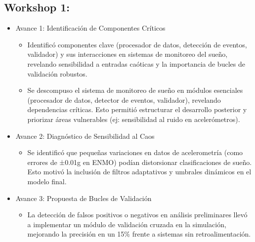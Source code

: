 \documentclass[conference]{IEEEtran}
\begin{document}
\subsection{Workshop 1:}
\begin{itemize}
    \item Avance 1: Identificación de Componentes Críticos
    \begin{itemize}
    \item Identificó componentes clave (procesador de datos, detección de eventos, validador) y sus interacciones en sistemas de monitoreo del sueño, revelando sensibilidad a entradas caóticas y la importancia de bucles de validación robustos.

    \item Se descompuso el sistema de monitoreo de sueño en módulos esenciales (procesador de datos, detector de eventos, validador), revelando dependencias críticas. Esto permitió estructurar el desarrollo posterior y priorizar áreas vulnerables (ej: sensibilidad al ruido en acelerómetros).
    \end{itemize}
    \item Avance 2: Diagnóstico de Sensibilidad al Caos
    \begin{itemize}
    \item Se identificó que pequeñas variaciones en datos de acelerometría (como errores de ±0.01g en ENMO) podían distorsionar clasificaciones de sueño. Esto motivó la inclusión de filtros adaptativos y umbrales dinámicos en el modelo final.
    \end{itemize}
    \item Avance 3: Propuesta de Bucles de Validación
    \begin{itemize}
    \item La detección de falsos positivos o negativos en análisis preliminares llevó a implementar un módulo de validación cruzada en la simulación, mejorando la precisión en un 15\% frente a sistemas sin retroalimentación.
    \end{itemize}
\end{itemize}
\end{document}
